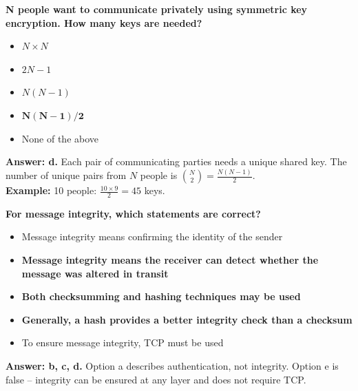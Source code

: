 \begin{tcolorbox}[exambox, title=V23/V24 Q1.5.2 -- Number of Symmetric Keys]
\textbf{N people want to communicate privately using symmetric key encryption. How many keys are needed?}
\begin{itemize}[noitemsep]
  \item[a)] $N \times N$
  \item[b)] $2N - 1$
  \item[c)] $N(N-1)$
  \item[\textbf{d)}] $\mathbf{N(N-1)/2}$ \checkmark
  \item[e)] None of the above
\end{itemize}
\textbf{Answer: d.} Each pair of communicating parties needs a unique shared key. The number of unique pairs from $N$ people is $\binom{N}{2} = \frac{N(N-1)}{2}$.\\
\textbf{Example:} 10 people: $\frac{10 \times 9}{2} = 45$ keys.
\end{tcolorbox}

\begin{tcolorbox}[exambox, title=V23/V24 Q1.5.3 -- Message Integrity]
\textbf{For message integrity, which statements are correct?}
\begin{itemize}[noitemsep]
  \item[a)] Message integrity means confirming the identity of the sender
  \item[\textbf{b)}] \textbf{Message integrity means the receiver can detect whether the message was altered in transit} \checkmark
  \item[\textbf{c)}] \textbf{Both checksumming and hashing techniques may be used} \checkmark
  \item[\textbf{d)}] \textbf{Generally, a hash provides a better integrity check than a checksum} \checkmark
  \item[e)] To ensure message integrity, TCP must be used
\end{itemize}
\textbf{Answer: b, c, d.} Option a describes authentication, not integrity. Option e is false -- integrity can be ensured at any layer and does not require TCP.
\end{tcolorbox}

